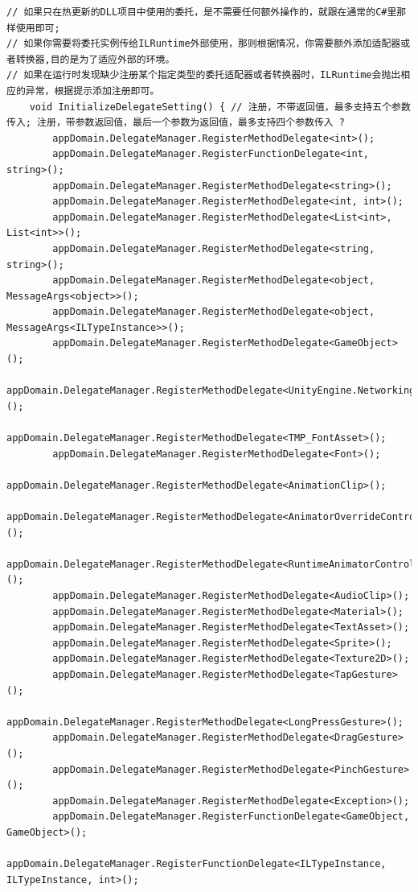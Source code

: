 \documentclass[9pt, b5paper]{article}
\begin{document}
\begin{verbatim}
// 如果只在热更新的DLL项目中使用的委托，是不需要任何额外操作的，就跟在通常的C#里那样使用即可;
// 如果你需要将委托实例传给ILRuntime外部使用，那则根据情况，你需要额外添加适配器或者转换器,目的是为了适应外部的环境。
// 如果在运行时发现缺少注册某个指定类型的委托适配器或者转换器时，ILRuntime会抛出相应的异常，根据提示添加注册即可。
    void InitializeDelegateSetting() { // 注册，不带返回值，最多支持五个参数传入; 注册，带参数返回值，最后一个参数为返回值，最多支持四个参数传入 ?
        appDomain.DelegateManager.RegisterMethodDelegate<int>();
        appDomain.DelegateManager.RegisterFunctionDelegate<int, string>();
        appDomain.DelegateManager.RegisterMethodDelegate<string>();
        appDomain.DelegateManager.RegisterMethodDelegate<int, int>();
        appDomain.DelegateManager.RegisterMethodDelegate<List<int>, List<int>>();
        appDomain.DelegateManager.RegisterMethodDelegate<string, string>();
        appDomain.DelegateManager.RegisterMethodDelegate<object, MessageArgs<object>>();
        appDomain.DelegateManager.RegisterMethodDelegate<object, MessageArgs<ILTypeInstance>>();
        appDomain.DelegateManager.RegisterMethodDelegate<GameObject>();
        appDomain.DelegateManager.RegisterMethodDelegate<UnityEngine.Networking.UnityWebRequest>();
        appDomain.DelegateManager.RegisterMethodDelegate<TMP_FontAsset>();
        appDomain.DelegateManager.RegisterMethodDelegate<Font>();
        appDomain.DelegateManager.RegisterMethodDelegate<AnimationClip>();
        appDomain.DelegateManager.RegisterMethodDelegate<AnimatorOverrideController>();
        appDomain.DelegateManager.RegisterMethodDelegate<RuntimeAnimatorController>();
        appDomain.DelegateManager.RegisterMethodDelegate<AudioClip>();
        appDomain.DelegateManager.RegisterMethodDelegate<Material>();
        appDomain.DelegateManager.RegisterMethodDelegate<TextAsset>();
        appDomain.DelegateManager.RegisterMethodDelegate<Sprite>();
        appDomain.DelegateManager.RegisterMethodDelegate<Texture2D>();
        appDomain.DelegateManager.RegisterMethodDelegate<TapGesture>();
        appDomain.DelegateManager.RegisterMethodDelegate<LongPressGesture>();
        appDomain.DelegateManager.RegisterMethodDelegate<DragGesture>();
        appDomain.DelegateManager.RegisterMethodDelegate<PinchGesture>();
        appDomain.DelegateManager.RegisterMethodDelegate<Exception>();
        appDomain.DelegateManager.RegisterFunctionDelegate<GameObject, GameObject>();
        appDomain.DelegateManager.RegisterFunctionDelegate<ILTypeInstance, ILTypeInstance, int>();


\end{verbatim}
\end{document}
